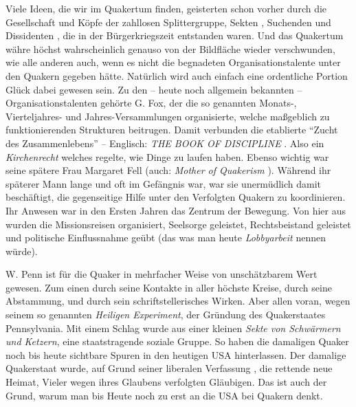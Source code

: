 \medskip

Viele Ideen, die wir im Quakertum finden, geisterten schon vorher durch die
Gesellschaft und Köpfe der zahllosen Splittergruppe, Sekten
, Suchenden und
Dissidenten , die in der Bürgerkriegszeit
 entstanden waren. Und das Quakertum
währe höchst wahrscheinlich genauso von der Bildfläche wieder verschwunden, wie
alle anderen auch, wenn es nicht die begnadeten Organisationstalente unter den
Quakern gegeben hätte. Natürlich wird auch einfach eine ordentliche Portion
Glück
dabei gewesen sein. Zu den -- heute noch allgemein bekannten --
Organisationstalenten gehörte G. Fox, der die so genannten Monats-,
Vierteljahres-
und Jahres-Versammlungen  
 organisierte, welche maßgeblich zu
funktionierenden
Strukturen beitrugen. Damit verbunden die etablierte "`Zucht des
Zusammenlebens"' 
--
Englisch: \textit{THE BOOK OF DISCIPLINE}  . Also ein
\textit{Kirchenrecht}  welches
regelte, wie Dinge zu laufen haben. Ebenso wichtig war seine spätere Frau
Margaret Fell  (auch: \textit{Mother of
Quakerism} ). Während ihr späterer Mann
lange und oft im Gefängnis war, war sie unermüdlich damit beschäftigt, die
gegenseitige Hilfe unter den Verfolgten  Quakern zu
koordinieren. Ihr Anwesen
war in den Ersten Jahren das Zentrum der Bewegung. Von hier aus wurden die
Missionsreisen organisiert, Seelsorge  geleistet,
Rechtsbeistand geleistet und
politische Einflussnahme  geübt (das was man heute
\textit{Lobbyarbeit}  nennen
würde).

\medskip

W. Penn ist für die Quaker in mehrfacher Weise von unschätzbarem Wert gewesen.
Zum einen durch seine Kontakte in aller höchste Kreise, durch seine Abstammung,
und
durch sein schriftstellerisches Wirken. Aber allen voran, wegen seinem so
genannten \textit{Heiligen Experiment}, der
Gründung des Quakerstaates  
Pennsylvania. Mit einem Schlag wurde aus einer kleinen \textit{Sekte von
Schwärmern und Ketzern}, eine staatstragende soziale Gruppe. So haben die
damaligen Quaker noch bis heute sichtbare Spuren in den heutigen USA
hinterlassen.
Der damalige Quakerstaat wurde, auf Grund seiner liberalen Verfassung
, die
rettende neue Heimat, Vieler wegen ihres Glaubens verfolgten Gläubigen. Das ist
auch der Grund, warum man bis Heute noch zu erst an die USA bei Quakern denkt.

